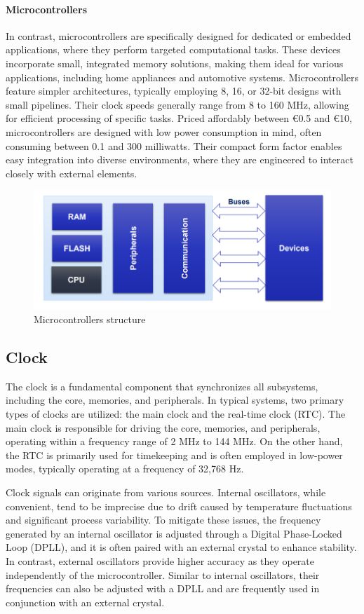 \paragraph*{Microcontrollers}
In contrast, microcontrollers are specifically designed for dedicated or embedded applications, where they perform targeted computational tasks. 
These devices incorporate small, integrated memory solutions, making them ideal for various applications, including home appliances and automotive systems.
Microcontrollers feature simpler architectures, typically employing 8, 16, or 32-bit designs with small pipelines. 
Their clock speeds generally range from 8 to 160 MHz, allowing for efficient processing of specific tasks. 
Priced affordably between €0.5 and €10, microcontrollers are designed with low power consumption in mind, often consuming between 0.1 and 300 milliwatts. 
Their compact form factor enables easy integration into diverse environments, where they are engineered to interact closely with external elements.
\begin{figure}[H]
    \centering
    \includegraphics[width=0.75\linewidth]{images/miccon.png}
    \caption{Microcontrollers structure}
\end{figure}

\subsection{Clock}
The clock is a fundamental component that synchronizes all subsystems, including the core, memories, and peripherals. 
In typical systems, two primary types of clocks are utilized: the main clock and the real-time clock (RTC). 
The main clock is responsible for driving the core, memories, and peripherals, operating within a frequency range of 2 MHz to 144 MHz. 
On the other hand, the RTC is primarily used for timekeeping and is often employed in low-power modes, typically operating at a frequency of 32,768 Hz.

Clock signals can originate from various sources. 
Internal oscillators, while convenient, tend to be imprecise due to drift caused by temperature fluctuations and significant process variability. 
To mitigate these issues, the frequency generated by an internal oscillator is adjusted through a Digital Phase-Locked Loop (DPLL), and it is often paired with an external crystal to enhance stability. 
In contrast, external oscillators provide higher accuracy as they operate independently of the microcontroller. 
Similar to internal oscillators, their frequencies can also be adjusted with a DPLL and are frequently used in conjunction with an external crystal.


